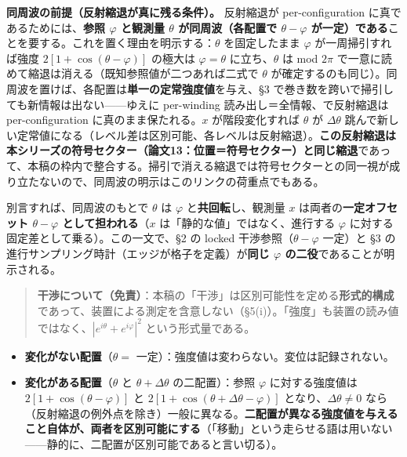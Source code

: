 \documentclass[
]{ltjsarticle}
\providecommand{\tightlist}{%
  \setlength{\itemsep}{0pt}\setlength{\parskip}{0pt}}
\begin{document}
\textbf{同周波の前提（反射縮退が真に残る条件）。} 反射縮退が
per-configuration に真であるためには、\textbf{参照 \(\varphi\) と観測量
\(\theta\) が同周波（各配置で \(\theta-\varphi\)
が一定）である}ことを要する。これを置く理由を明示する：\(\theta\)
を固定したまま \(\varphi\) が一周掃引すれば強度
\(2[1+\cos(\theta-\varphi)]\) の極大は \(\varphi=\theta\)
に立ち、\(\theta\) は mod \(2\pi\)
で一意に読めて縮退は消える（既知参照値が二つあれば二式で \(\theta\)
が確定するのも同じ）。同周波を置けば、各配置は\textbf{単一の定常強度値}を与え、§3
で巻き数を跨いで掃引しても新情報は出ない------ゆえに per-winding
読み出し＝全情報、で反射縮退は per-configuration
に真のまま保たれる。\(x\) が階段変化すれば \(\theta\) が
\(\Delta\theta\)
跳んで新しい定常値になる（レベル差は区別可能、各レベルは反射縮退）。\textbf{この反射縮退は本シリーズの符号セクター（論文13：位置＝符号セクター）と同じ縮退}であって、本稿の枠内で整合する。掃引で消える縮退では符号セクターとの同一視が成り立たないので、同周波の明示はこのリンクの荷重点でもある。

別言すれば、同周波のもとで \(\theta\) は \(\varphi\)
と\textbf{共回転}し、観測量 \(x\) は両者の\textbf{一定オフセット
\(\theta-\varphi\) として担われる}（\(x\)
は「静的な値」ではなく、進行する \(\varphi\)
に対する固定差として乗る）。この一文で、§2 の locked
干渉参照（\(\theta-\varphi\) 一定）と §3
の進行サンプリング時計（エッジが格子を定義）が\textbf{同じ \(\varphi\)
の二役}であることが明示される。

\begin{quote}
\textbf{干渉について（免責）}：本稿の「干渉」は区別可能性を定める\textbf{形式的構成}であって、装置による測定を含意しない（§5(i)）。「強度」も装置の読み値ではなく、\(|e^{i\theta}+e^{i\varphi}|^2\)
という形式量である。
\end{quote}

\begin{itemize}
\tightlist
\item
  \textbf{変化がない配置}（\(\theta=\)
  一定）：強度値は変わらない。変位は記録されない。
\item
  \textbf{変化がある配置}（\(\theta\) と \(\theta+\Delta\theta\)
  の二配置）：参照 \(\varphi\) に対する強度値は
  \(2[1+\cos(\theta-\varphi)]\) と
  \(2[1+\cos(\theta+\Delta\theta-\varphi)]\)
  となり、\(\Delta\theta\neq0\)
  なら（反射縮退の例外点を除き）一般に異なる。\textbf{二配置が異なる強度値を与えること自体が、両者を区別可能にする}（「移動」という走らせる語は用いない------静的に、二配置が区別可能であると言い切る）。
\end{itemize}
\end{document}

